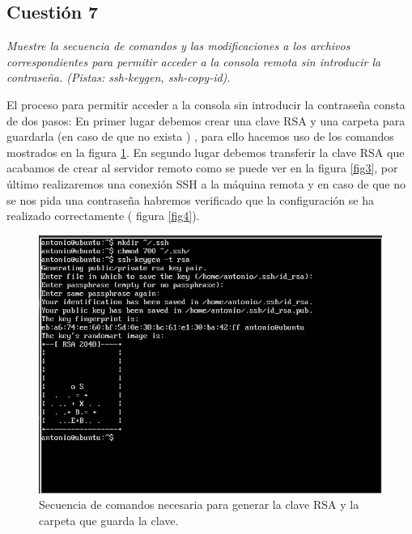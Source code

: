 \subsection{Cuestión 7}
\textit{Muestre la secuencia de comandos y las modificaciones a los archivos correspondientes para permitir acceder a la consola remota sin introducir la contraseña. (Pistas: ssh-keygen, ssh-copy-id).}
\newline

El proceso para permitir acceder a la consola sin introducir la contraseña consta de dos pasos: En primer lugar debemos crear una clave RSA y una carpeta para guardarla (en caso de que no exista ) , para ello hacemos uso de los comandos mostrados en la figura \ref{fig2}. En segundo lugar debemos transferir la clave RSA que acabamos de crear al servidor remoto como se puede ver en la figura \ref{fig3}, por último realizaremos una conexión SSH a la máquina remota y en caso de que no se nos pida una contraseña habremos verificado que la configuración se ha realizado correctamente ( figura \ref{fig4}). \cite{passssh}

\begin{figure}[H]
    \begin{center}
        \includegraphics[scale=0.45]{imagenes/img2}
        \caption{Secuencia de comandos necesaria para generar la clave RSA y la carpeta que guarda la clave.}
        \label{fig2}
    \end{center}
\end{figure}

